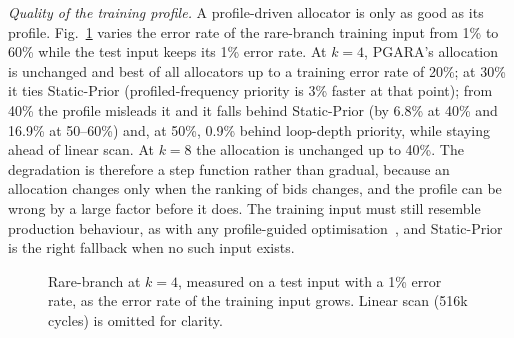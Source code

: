 \documentclass{ieeeaccess}
\newcommand{\MG}{PGARA}
\begin{document}
\textit{Quality of the training profile.} A profile-driven allocator is
only as good as its profile. Fig.~\ref{fig:errsweep} varies the error
rate of the rare-branch training input from 1\% to 60\% while the test
input keeps its 1\% error rate. At $k=4$, \MG's allocation is unchanged
and best of all allocators up to a training error rate of 20\%; at
30\% it ties Static-Prior (profiled-frequency priority is 3\% faster at
that point); from 40\% the profile misleads it and it falls
behind Static-Prior (by 6.8\% at 40\% and 16.9\% at 50--60\%) and, at
50\%, 0.9\% behind loop-depth priority, while staying ahead of linear scan.
At $k=8$ the allocation is unchanged up to 40\%. The degradation is
therefore a step function rather than gradual, because an allocation
changes only when the ranking of bids changes, and the profile can be
wrong by a large factor before it does. The training input must still
resemble production behaviour, as with any profile-guided
optimisation~\cite{panchenko2019bolt,wagner1994}, and Static-Prior is
the right fallback when no such input exists.

\begin{figure}[t]
\centering
{}
\caption{Rare-branch at $k=4$, measured on a test input with a 1\%
error rate, as the error rate of the training input grows. Linear scan
(516k cycles) is omitted for clarity.}
\label{fig:errsweep}
\end{figure}
\end{document}

